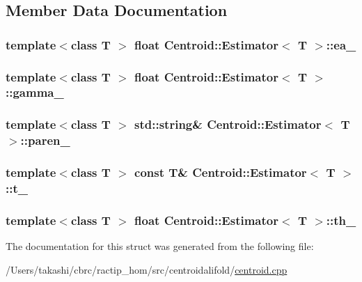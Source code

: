 \subsection{Member Data Documentation}
\hypertarget{struct_centroid_1_1_estimator_ad06b2a1760cef4bfd901adb4fc1cdd8c}{
\subsubsection[{ea\+\_\+}]{\setlength{\rightskip}{0pt plus 5cm}template$<$class T $>$ float {\bf Centroid\+::\+Estimator}$<$ T $>$\+::ea\+\_\+}}\label{struct_centroid_1_1_estimator_ad06b2a1760cef4bfd901adb4fc1cdd8c}
\hypertarget{struct_centroid_1_1_estimator_ad22e480a14f6b3217c53ebd4c300e1d0}{
\subsubsection[{gamma\+\_\+}]{\setlength{\rightskip}{0pt plus 5cm}template$<$class T $>$ float {\bf Centroid\+::\+Estimator}$<$ T $>$\+::gamma\+\_\+}}\label{struct_centroid_1_1_estimator_ad22e480a14f6b3217c53ebd4c300e1d0}
\hypertarget{struct_centroid_1_1_estimator_afb0a8a732c11deb042d0bb1ac5bb54ce}{
\subsubsection[{paren\+\_\+}]{\setlength{\rightskip}{0pt plus 5cm}template$<$class T $>$ std\+::string\& {\bf Centroid\+::\+Estimator}$<$ T $>$\+::paren\+\_\+}}\label{struct_centroid_1_1_estimator_afb0a8a732c11deb042d0bb1ac5bb54ce}
\hypertarget{struct_centroid_1_1_estimator_a877f55030c8443d3f26dc7d17ff0bbff}{
\subsubsection[{t\+\_\+}]{\setlength{\rightskip}{0pt plus 5cm}template$<$class T $>$ const T\& {\bf Centroid\+::\+Estimator}$<$ T $>$\+::t\+\_\+}}\label{struct_centroid_1_1_estimator_a877f55030c8443d3f26dc7d17ff0bbff}
\hypertarget{struct_centroid_1_1_estimator_a3c52755a2eea48a354dfb71eba71600f}{
\subsubsection[{th\+\_\+}]{\setlength{\rightskip}{0pt plus 5cm}template$<$class T $>$ float {\bf Centroid\+::\+Estimator}$<$ T $>$\+::th\+\_\+}}\label{struct_centroid_1_1_estimator_a3c52755a2eea48a354dfb71eba71600f}


The documentation for this struct was generated from the following file\+:\begin{DoxyCompactItemize}
\item 
/\+Users/takashi/cbrc/ractip\+\_\+hom/src/centroidalifold/\hyperlink{centroid_8cpp}{centroid.\+cpp}\end{DoxyCompactItemize}
